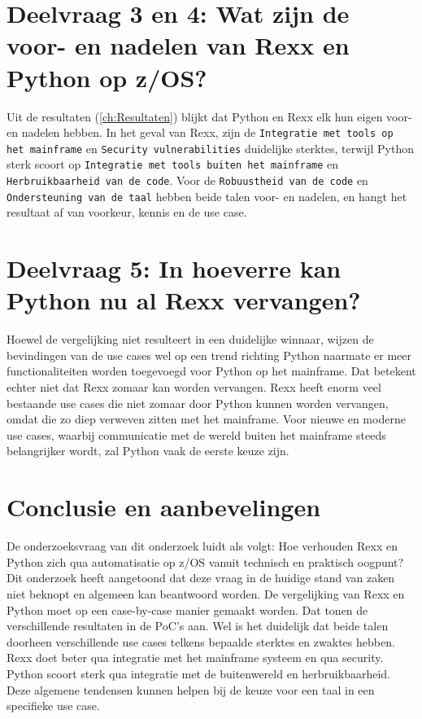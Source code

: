 \section{Deelvraag 3 en 4: Wat zijn de voor- en nadelen van Rexx en Python op z/OS?}
Uit de resultaten (\ref{ch:Resultaten}) blijkt dat Python en Rexx elk hun eigen voor- en nadelen hebben. In het geval van Rexx, zijn de \texttt{Integratie met tools op het mainframe} en \texttt{Security vulnerabilities} duidelijke sterktes, terwijl Python sterk scoort op \texttt{Integratie met tools buiten het mainframe} en \texttt{Herbruikbaarheid van de code}. Voor de \texttt{Robuustheid van de code} en \texttt{Ondersteuning van de taal} hebben beide talen voor- en nadelen, en hangt het resultaat af van voorkeur, kennis en de use case.

\section{Deelvraag 5: In hoeverre kan Python nu al Rexx vervangen?}
Hoewel de vergelijking niet resulteert in een duidelijke winnaar, wijzen de bevindingen van de use cases wel op een trend richting Python naarmate er meer functionaliteiten worden toegevoegd voor Python op het mainframe. Dat betekent echter niet dat Rexx zomaar kan worden vervangen. Rexx heeft enorm veel bestaande use cases die niet zomaar door Python kunnen worden vervangen, omdat die zo diep verweven zitten met het mainframe. Voor nieuwe en moderne use cases, waarbij communicatie met de wereld buiten het mainframe steeds belangrijker wordt, zal Python vaak de eerste keuze zijn. 

\section{Conclusie en aanbevelingen}
De onderzoeksvraag van dit onderzoek luidt als volgt: Hoe verhouden Rexx en Python zich qua automatisatie op z/OS vanuit technisch en praktisch oogpunt? Dit onderzoek heeft aangetoond dat deze vraag in de huidige stand van zaken niet beknopt en algemeen kan beantwoord worden. De vergelijking van Rexx en Python moet op een case-by-case manier gemaakt worden. Dat tonen de verschillende resultaten in de PoC's aan. Wel is het duidelijk dat beide talen doorheen verschillende use cases telkens bepaalde sterktes en zwaktes hebben. Rexx doet beter qua integratie met het mainframe systeem en qua security. Python scoort sterk qua integratie met de buitenwereld en herbruikbaarheid. Deze algemene tendensen kunnen helpen bij de keuze voor een taal in een specifieke use case. 

